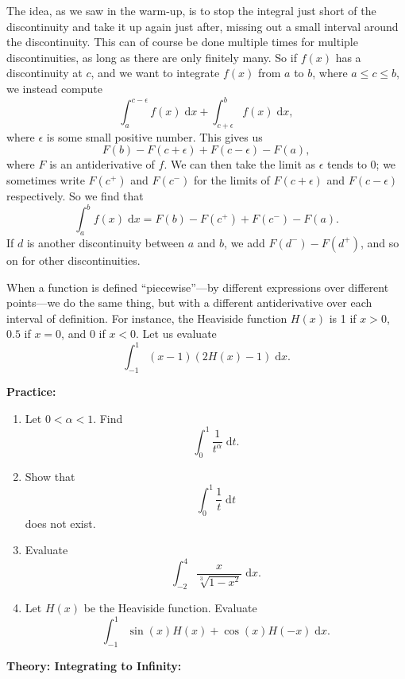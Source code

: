 \documentclass{article}
\newcommand{\diff}{\;\mathrm{d}}
\begin{document}
The idea, as we saw in the warm-up, is to stop the integral just short of the discontinuity and take it up again just after, missing out a small interval around the discontinuity. This can of course be done multiple times for multiple discontinuities, as long as there are only finitely many. So if $f(x)$ has a discontinuity at $c$, and we want to integrate $f(x)$ from $a$ to $b$, where $a\leq c\leq b$, we instead compute
\[\int_a^{c-\epsilon} f(x)\diff x + \int_{c+\epsilon}^b f(x)\diff x,\]
where $\epsilon$ is some small positive number. This gives us
\[F(b)-F(c+\epsilon)+F(c-\epsilon)-F(a),\]
where $F$ is an antiderivative of $f$. We can then take the limit as $\epsilon$ tends to 0; we sometimes write $F(c^+)$ and $F(c^-)$ for the limits of $F(c+\epsilon)$ and $F(c-\epsilon)$ respectively. So we find that
\[\int_a^b f(x)\diff x = F(b)-F(c^+)+F(c^-)-F(a).\]
If $d$ is another discontinuity between $a$ and $b$, we add $F(d^-)-F(d^+)$, and so on for other discontinuities.


When a function is defined ``piecewise''---by different expressions over different points---we do the same thing, but with a different antiderivative over each interval of definition. For instance, the Heaviside function $H(x)$ is 1 if $x>0$, $0.5$ if $x=0$, and $0$ if $x<0$. Let us evaluate \[\int_{-1}^1 (x-1)(2H(x)-1)\diff x.\]


\clearpage






\textbf{Practice:}\bigskip


\begin{enumerate}
	\item Let $0<\alpha<1$. Find
		\[\int_0^1 \frac{1}{t^{\alpha}}\diff t.\]
	\item Show that
		\[\int_0^1 \frac{1}{t}\diff t\]
		does not exist.
	\item Evaluate
		\[\int_{-2}^{4} \frac{x}{\sqrt[3]{1-x^2}}\diff x.\]
	\item Let $H(x)$ be the Heaviside function. Evaluate
		\[\int_{-1}^1 \sin(x)H(x)+\cos(x)H(-x)\diff x.\]
\end{enumerate}




\clearpage







\textbf{Theory: Integrating to Infinity:}

\bigskip
\end{document}
